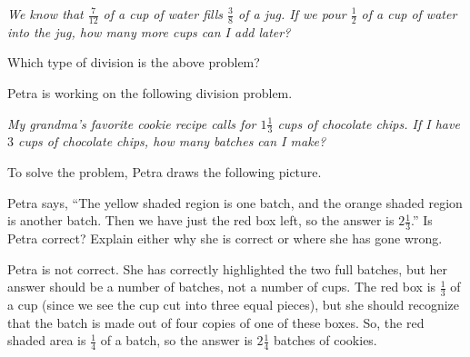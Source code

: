 \documentclass[nooutcomes]{ximera}
\begin{document}
\begin{problem}
{\em We know that $\frac{7}{12}$ of a cup of water fills $\frac{3}{8}$ of a jug.  If we pour $\frac{1}{2}$ of a cup of water into the jug, how many more cups can I add later?}

Which type of division is the above problem?
\begin{multipleChoice}
\end{multipleChoice}
\end{problem}



\begin{problem}
Petra is working on the following division problem.

{\em My grandma's favorite cookie recipe calls for $1 \frac{1}{3}$ cups of chocolate chips.  If I have $3$ cups of chocolate chips, how many batches can I make?}

To solve the problem, Petra draws the following picture.
\begin{center}
\end{center}

Petra says, ``The yellow shaded region is one batch, and the orange shaded region is another batch.  Then we have just the red box left, so the answer is $2 \frac{1}{3}$.''  Is Petra correct?  Explain either why she is correct or where she has gone wrong.

\begin{freeResponse}
	\begin{hint}
	Petra is not correct.  She has correctly highlighted the two full batches, but her answer should be a number of batches, not a number of cups.  The red box is $\frac{1}{3}$ of a cup (since we see the cup cut into three equal pieces), but she should recognize that the batch is made out of four copies of one of these boxes.  So, the red shaded area is $\frac{1}{4}$ of a batch, so the answer is $2 \frac{1}{4}$ batches of cookies.
	\end{hint}
\end{freeResponse} 


\end{problem}
\end{document}
